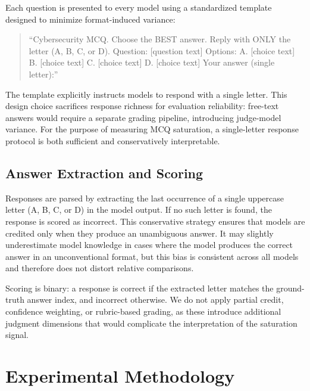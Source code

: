 \documentclass[journal]{IEEEtran}
\begin{document}
Each question is presented to every model using a standardized template designed to minimize format-induced variance:

\begin{quote}
\small
``Cybersecurity MCQ. Choose the BEST answer. Reply with ONLY the letter (A, B, C, or D).\newline
Question: [question text]\newline
Options:\newline
A. [choice text]\newline
B. [choice text]\newline
C. [choice text]\newline
D. [choice text]\newline
Your answer (single letter):''
\end{quote}

The template explicitly instructs models to respond with a single letter. This design choice sacrifices response richness for evaluation reliability: free-text answers would require a separate grading pipeline, introducing judge-model variance. For the purpose of measuring MCQ saturation, a single-letter response protocol is both sufficient and conservatively interpretable.

\subsection{Answer Extraction and Scoring}

Responses are parsed by extracting the last occurrence of a single uppercase letter (A, B, C, or D) in the model output. If no such letter is found, the response is scored as incorrect. This conservative strategy ensures that models are credited only when they produce an unambiguous answer. It may slightly underestimate model knowledge in cases where the model produces the correct answer in an unconventional format, but this bias is consistent across all models and therefore does not distort relative comparisons.

Scoring is binary: a response is correct if the extracted letter matches the ground-truth answer index, and incorrect otherwise. We do not apply partial credit, confidence weighting, or rubric-based grading, as these introduce additional judgment dimensions that would complicate the interpretation of the saturation signal.

\section{Experimental Methodology}
\end{document}
